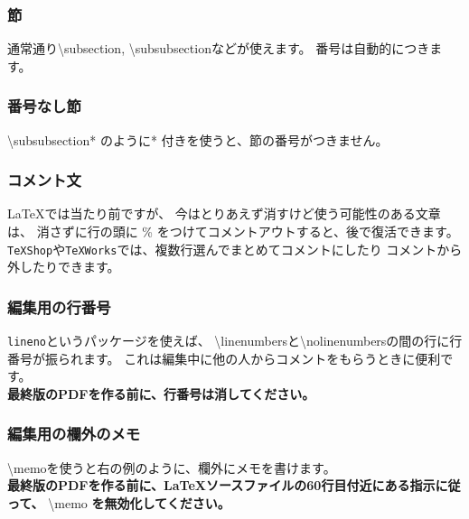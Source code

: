 \documentclass[11pt,a4j,dvipdfmx]{jarticle} 					%
\newcommand{\研究課題名}{象の卵}
\newcommand{\研究機関名}{逢坂大学}
\newcommand{\研究代表者氏名}{湯川秀樹}
\newcommand{\研究期間の最終元号年度}{11}  %
\newcommand{\memo}[1]{\marginpar{#1}}
\begin{document}
        \subsubsection{節}
        通常通り\textbackslash subsection, \textbackslash subsubsectionなどが使えます。
        番号は自動的につきます。
        
        \subsubsection*{番号なし節}
        \textbackslash subsubsection* のように* 付きを使うと、節の番号がつきません。
        
        \subsubsection{コメント文}
        \LaTeX では当たり前ですが、
        今はとりあえず消すけど使う可能性のある文章は、
        消さずに行の頭に \% をつけてコメントアウトすると、後で復活できます。
        \texttt{TeXShop}や\texttt{TeXWorks}では、複数行選んでまとめてコメントにしたり
        コメントから外したりできます。
        
        \subsubsection{編集用の行番号}
        \texttt{lineno}というパッケージを使えば、
        \textbackslash linenumbersと\textbackslash nolinenumbersの間の行に行番号が振られます。
        これは編集中に他の人からコメントをもらうときに便利です。\\
        \textbf{最終版のPDFを作る前に、行番号は消してください。}
        
        \subsubsection{編集用の欄外のメモ}
        \textbackslash memo{}を使うと右の例のように、欄外にメモを書けます。\\
        \memo{欄外メモ\\だよ}
        \textbf{最終版のPDFを作る前に、\LaTeX ソースファイルの60行目付近にある指示に従って、}
        \textbackslash memo \textbf{を無効化してください。}
        
        \nolinenumbers
\end{document}

